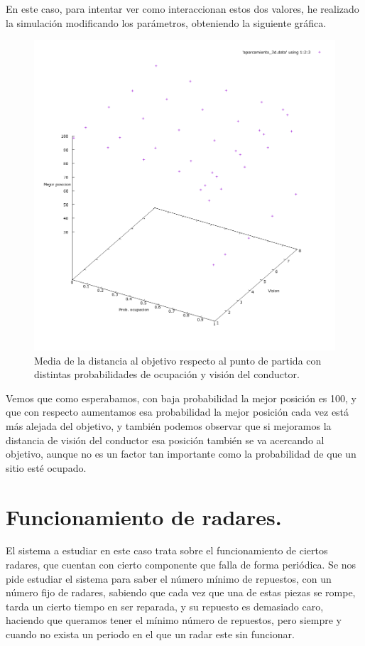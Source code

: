 \documentclass[12pt, spanish]{article}
\begin{document}
En este caso, para intentar ver como interaccionan estos dos valores, he realizado la simulación modificando los parámetros, obteniendo la siguiente gráfica.

\begin{figure}[H]
	\centering
	\includegraphics[scale = 0.55]{aparcamiento_3d.png}
	\caption{Media de la distancia al objetivo respecto al punto de partida con distintas probabilidades de ocupación y visión del conductor.}
	\label{fig:ej4}
\end{figure}

Vemos que como esperabamos, con baja probabilidad la mejor posición es 100, y que con respecto aumentamos esa probabilidad la mejor posición cada vez está más alejada del objetivo, y también podemos observar que si mejoramos la distancia de visión del conductor esa posición también se va acercando al objetivo, aunque no es un factor tan importante como la probabilidad de que un sitio esté ocupado.


\section{Funcionamiento de radares.}

El sistema a estudiar en este caso trata sobre el funcionamiento de ciertos radares, que cuentan con cierto componente que falla de forma periódica. Se nos pide estudiar el sistema para saber el número mínimo de repuestos, con un número fijo de radares, sabiendo que cada vez que una de estas piezas se rompe, tarda un cierto tiempo en ser reparada, y su repuesto es demasiado caro, haciendo que queramos tener el mínimo número de repuestos, pero siempre y cuando no exista un periodo en el que un radar este sin funcionar.
\end{document}
